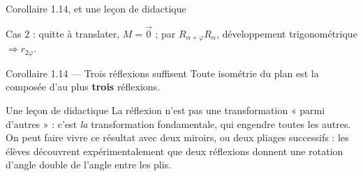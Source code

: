 \begin{frame}{Corollaire 1.14, et une leçon de didactique}
  \begin{AuTableau}
    \small Cas $2$ : quitte à translater, $M=\vec 0$ ; par
    $R_{\alpha+\varphi}R_\alpha$, développement trigonométrique
    $\Rightarrow r_{2\varphi}$.
  \end{AuTableau}
  \begin{Enonce}{Corollaire 1.14 --- Trois réflexions suffisent}
    Toute isométrie du plan est la composée d'au plus \textbf{trois}
    réflexions.
  \end{Enonce}
  \begin{Classe}{Une leçon de didactique}
    \small La réflexion n'est pas une transformation « parmi
    d'autres » : c'est \emph{la} transformation fondamentale, qui
    engendre toutes les autres. On peut faire vivre ce résultat avec
    deux miroirs, ou deux pliages successifs : les élèves découvrent
    expérimentalement que deux réflexions donnent une rotation d'angle
    double de l'angle entre les plis.
  \end{Classe}
\end{frame}
